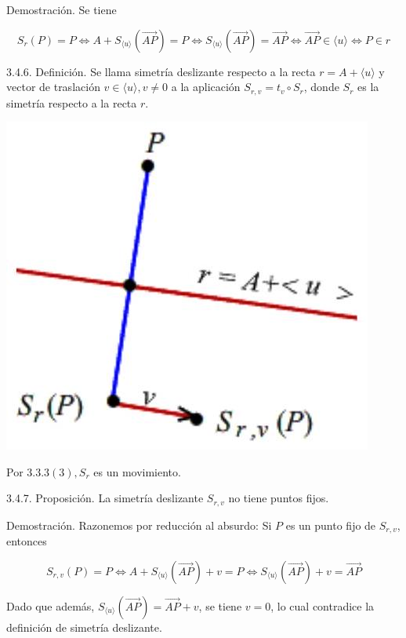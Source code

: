 \documentclass[12pt, a4paper, ones, notitlepage, openany,titlepage]{article}
\begin{document}
Demostración. Se tiene

$$
S_{r}(P)=P \Longleftrightarrow A+S_{\langle u\rangle}(\overrightarrow{A P})=P \Longleftrightarrow S_{\langle u\rangle}(\overrightarrow{A P})=\overrightarrow{A P} \Longleftrightarrow \overrightarrow{A P} \in\langle u\rangle \Longleftrightarrow P \in r
$$

3.4.6. Definición. Se llama simetría deslizante respecto a la recta $r=A+\langle u\rangle$ y vector de traslación $v \in\langle u\rangle, v \neq 0$ a la aplicación $S_{r, v}=t_{v} \circ S_{r}$, donde $S_{r}$ es la simetría respecto a la recta $r$.

\begin{center}
	\includegraphics[max width=\textwidth]{2023_04_25_301d1803eaf1bc74cfd9g-081}
\end{center}

Por $3.3 .3(3), S_{r}$ es un movimiento.

3.4.7. Proposición. La simetría deslizante $S_{r, v}$ no tiene puntos fijos.

Demostración. Razonemos por reducción al absurdo: Si $P$ es un punto fijo de $S_{r, v}$, entonces

$$
S_{r, v}(P)=P \Longleftrightarrow A+S_{\langle u\rangle}(\overrightarrow{A P})+v=P \Longleftrightarrow S_{\langle u\rangle}(\overrightarrow{A P})+v=\overrightarrow{A P}
$$

Dado que además, $S_{\langle u\rangle}(\overrightarrow{A P})=\overrightarrow{A P}+v$, se tiene $v=0$, lo cual contradice la definición de simetría deslizante.
\end{document}
